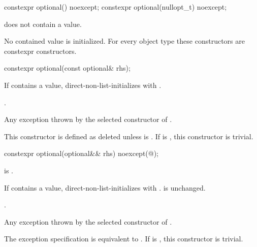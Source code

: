 %
\begin{itemdecl}
constexpr optional() noexcept;
constexpr optional(nullopt_t) noexcept;
\end{itemdecl}

\begin{itemdescr}
\pnum
\ensures
{} does not contain a value.

\pnum
\remarks
No contained value is initialized.
For every object type  these constructors are constexpr constructors.
\end{itemdescr}

%
\begin{itemdecl}
constexpr optional(const optional& rhs);
\end{itemdecl}

\begin{itemdescr}
\pnum
\effects
If  contains a value, direct-non-list-initializes 
with .

\pnum
\ensures
{}.

\pnum
\throws
Any exception thrown by the selected constructor of .

\pnum
\remarks
This constructor is defined as deleted unless
 is .
If  is ,
this constructor is trivial.
\end{itemdescr}

%
\begin{itemdecl}
constexpr optional(optional&& rhs) noexcept(@\seebelow@);
\end{itemdecl}

\begin{itemdescr}
\pnum
\constraints
{} is .

\pnum
\effects
If  contains a value, direct-non-list-initializes 
with .
 is unchanged.

\pnum
\ensures
{}.

\pnum
\throws
Any exception thrown by the selected constructor of .

\pnum
\remarks
The exception specification is equivalent to
.
If  is ,
this constructor is trivial.
\end{itemdescr}

